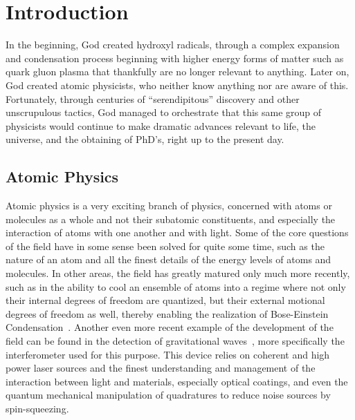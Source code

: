 \ifx\justbeingincluded\undefined


\fi

\chapter{Introduction}
\label{iii}

In the beginning, God created hydroxyl radicals, through a complex expansion and condensation process beginning with higher energy forms of matter such as quark gluon plasma that thankfully are no longer relevant to anything.
Later on, God created atomic physicists, who neither know anything nor are aware of this.
Fortunately, through centuries of ``serendipitous'' discovery and other unscrupulous tactics, God managed to orchestrate that this same group of physicists would continue to make dramatic advances relevant to life, the universe, and the obtaining of PhD's, right up to the present day.

\section{Atomic Physics}

Atomic physics is a very exciting branch of physics, concerned with atoms or molecules as a whole and not their subatomic constituents, and especially the interaction of atoms with one another and with light.
Some of the core questions of the field have in some sense been solved for quite some time, such as the nature of an atom and all the finest details of the energy levels of atoms and molecules.
In other areas, the field has greatly matured only much more recently, such as in the ability to cool an ensemble of atoms into a regime where not only their internal degrees of freedom are quantized, but their external motional degrees of freedom as well, thereby enabling the realization of Bose-Einstein Condensation~\cite{Anderson1995,Davis1995}.
Another even more recent example of the development of the field can be found in the detection of gravitational waves~\cite{Abbott2016}, more specifically the interferometer used for this purpose. 
This device relies on coherent and high power laser sources and the finest understanding and management of the interaction between light and materials, especially optical coatings, and even the quantum mechanical manipulation of quadratures to reduce noise sources by spin-squeezing.

